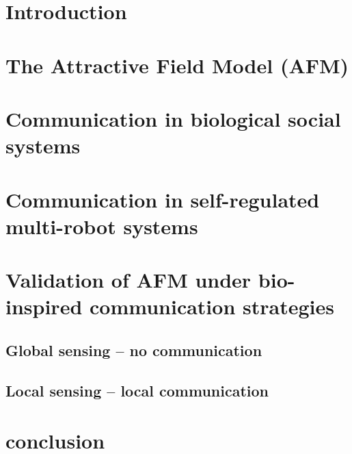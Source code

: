 \documentclass{intech}
\affiliation{University of Wales, Newport}
\begin{document}
\maketitle

\section{Introduction}

\section{The Attractive Field Model (AFM)}
\label{afm}

\section{Communication in biological social systems}
\label{bio-comm}

\section{Communication in self-regulated multi-robot systems}
\label{mrs-comm}

\section{Validation of AFM under bio-inspired communication strategies}
\subsection{Global sensing -- no communication}
\subsection{ Local sensing -- local communication}

\section{conclusion}


 
\end{document}
